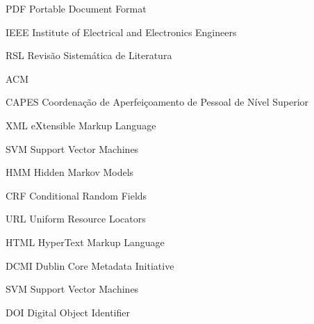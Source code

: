 
\begin{siglas}
  \item[PDF] Portable Document Format
  \item[IEEE] Institute of Electrical and Electronics Engineers
  \item[RSL] Revisão Sistemática de Literatura
  \item[ACM] 
  \item[CAPES] Coordenação de Aperfeiçoamento de Pessoal de Nível Superior
  \item[XML] eXtensible Markup Language
  \item[SVM] Support Vector Machines
  \item[HMM] Hidden Markov Models
  \item[CRF] Conditional Random Fields
  \item[URL] Uniform Resource Locators
  \item[HTML] HyperText Markup Language
  \item[DCMI] Dublin Core Metadata Initiative
  \item[SVM] Support Vector Machines
  \item[DOI] Digital Object Identifier
\end{siglas}